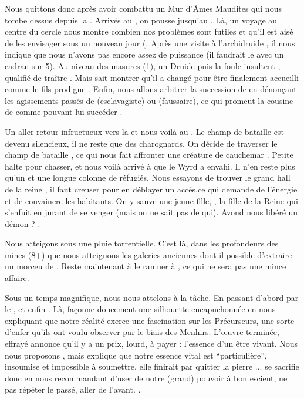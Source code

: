 \documentclass[11pt]{article}
\begin{document}
{Nous quittons donc \longcairn{} après avoir combattu un Mur d'Âmes Maudites qui nous tombe dessus depuis la \valleegardiens{}. Arrivés au \visageserein{}, on pousse jusqu'au \cerclelunaire{}. Là, un voyage au centre du cercle nous montre combien nos problèmes sont futiles et qu'il est aisé de les envisager sous un nouveau jour (. Après une visite à l'archidruide \amergin{}, il nous indique que nous n'avons pas encore assez de puissance (il faudrait le  avec un cadran sur 5). Au niveau des masures (1), un Druide puis la foule insultent \larve{}, qualifié de traître . Mais \larve{} sait montrer qu'il a changé  pour être finalement accueilli comme le fils prodigue . Enfin, nous allons arbitrer la succession de \geraint{} en dénonçant les agissements passés de \morfran{} (esclavagiste) ou \breagach{} (faussaire), ce qui promeut la cousine de \geraint{} comme pouvant lui succéder .

Un aller retour infructueux vers la \croisee{} et nous voilà au \valsanglant{}. Le champ de bataille est devenu silencieux, il ne reste que des charognards. On décide de traverser le champ de bataille \gain{\life[-1]}, ce qui nous fait affronter une créature de cauchemar \gain{\rich[1]}. Petite halte \sousmuraille{} pour chasser, et nous voilà arrivé à \loincomtat{} que le Wyrd a envahi. Il n'en reste plus qu'un \dolmeneffondre{} et une longue colonne de réfugiés. Nous essayons de trouver le grand hall de la reine \kincaid{}, il faut creuser pour en déblayer un accès,ce qui demande de l'énergie et de convaincre les habitants. On y sauve une jeune fille, \siobhan{}, la fille de la Reine qui s'enfuit en jurant de se venger (mais on ne sait pas de qui). Avond nous libéré un démon ? .

Nous atteigons \devastation{} sous une pluie torrentielle. C'est là, dans les profondeurs des mines (8+) que nous atteignons les galeries anciennes dont il possible d'extraire un morceu de \wyrdparfait{} . Reste maintenant à le ramner à \orrin{}, ce qui ne sera pas une mince affaire.


Sous un temps magnifique, nous nous attelons à la tâche. En passant d'abord par le  \valsanglant{}, \visageserein{} et enfin \longcairn{}. Là, \orrin{} façonne doucement une silhouette encapuchonnée en nous expliquant que notre réalité exerce une fascination sur les Précurseurs, une sorte d'enfer qu'ils ont voulu observer par le biais des Menhirs. L'\oe{}uvre terminée, \orrin{} effrayé annonce qu'il y a un prix, lourd, à payer : l'essence d'un être vivant. Nous nous proposons , mais \orrin{} explique que notre essence vital est ``particulière'', insoumise et impossible à soumettre, elle finirait par quitter la pierre ... \orrin{} se sacrifie donc  en nous recommandant d'user de notre (grand) pouvoir à bon escient, ne pas répéter le passé, aller de l'avant. .

}
\end{document}

